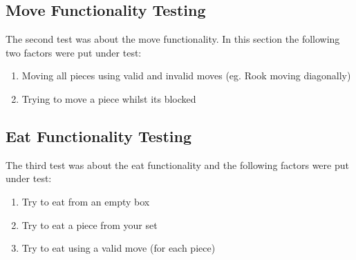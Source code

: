 \documentclass[12pt, A4]{report}
\begin{document}
		\subsection*{Move Functionality Testing}
		The second test was about the move functionality. In this section the following two factors were put under test:
			\begin{enumerate}
				\item Moving all pieces using valid and invalid moves (eg. Rook moving diagonally)
				\item Trying to move a piece whilst its blocked
			\end{enumerate}

			\begin{figure}[h]
				\centering	
				\qquad
			\end{figure}

		\subsection*{Eat Functionality Testing}
		The third test was about the eat functionality and the following factors were put under test:
			\begin{enumerate}
				\item Try to eat from an empty box
				\item Try to eat a piece from your set
				\item Try to eat using a valid move (for each piece)
			\end{enumerate}
\end{document}
